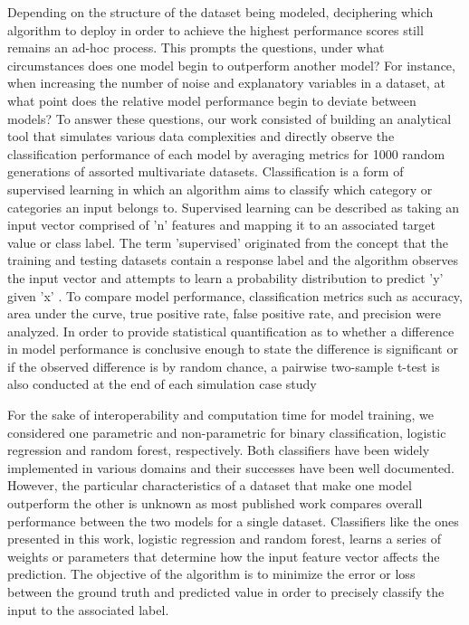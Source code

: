 \documentclass{llncs}
\begin{document}
\noindent 
Depending on the structure of the dataset being modeled, deciphering which algorithm to deploy in order to achieve the highest performance scores still remains an ad-hoc process. This prompts the questions, under what circumstances does one model begin to outperform another model? For instance, when increasing the number of noise and explanatory variables in a dataset, at what point does the relative model performance begin to deviate between models? To answer these questions, our work consisted of building an analytical tool that simulates various data complexities and directly observe the classification performance of each model by averaging metrics for 1000 random generations of assorted multivariate datasets. Classification is a form of supervised learning in which an algorithm aims to classify which category or categories an input belongs to. Supervised learning can be described as taking an input vector comprised of 'n' features and mapping it to an associated target value or class label. The term 'supervised' originated from the concept that the training and testing datasets contain a response label and the algorithm observes the input vector and attempts to learn a probability distribution to predict 'y' given 'x' \cite{goodfellow}. To compare model performance, classification metrics such as accuracy, area under the curve, true positive rate, false positive rate, and precision were analyzed. In order to provide statistical quantification as to whether a difference in model performance is conclusive enough to state the difference is significant or if the observed difference is by random chance, a pairwise two-sample t-test is also conducted at the end of each simulation case study 

\noindent 
For the sake of interoperability and computation time for model training, we considered one parametric and non-parametric for binary classification, logistic regression and random forest, respectively. Both classifiers have been widely implemented in various domains and their successes have been well documented. However, the particular characteristics of a dataset that make one model outperform the other is unknown as most published work compares overall performance between the two models for a single dataset. Classifiers like the ones presented in this work, logistic regression and random forest, learns a series of weights or parameters that determine how the input feature vector affects the prediction. The objective of the algorithm is to minimize the error or loss between the ground truth and predicted value in order to precisely classify the input to the associated label.
\end{document}
